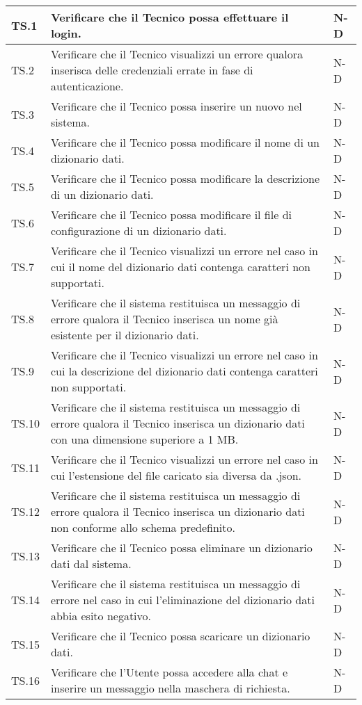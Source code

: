 \begin{adjustwidth}{-0.5cm}{-0.5cm}
\begin{longtable}{|P{1.5cm}|>{\raggedright}P{9.5cm}|>{\arraybackslash}P{1.5cm}|}
		TS.1 & Verificare che il Tecnico possa effettuare il login. & N-D \\
		\hline TS.2 & Verificare che il Tecnico visualizzi un errore qualora inserisca delle credenziali errate in fase di autenticazione. & N-D \\
		\hline TS.3 & Verificare che il Tecnico possa inserire un nuovo  nel sistema. & N-D \\ 
		\hline TS.4 & Verificare che il Tecnico possa modificare il nome di un dizionario dati. & N-D \\ 
		\hline TS.5 & Verificare che il Tecnico possa modificare la descrizione di un dizionario dati. & N-D \\
		\hline TS.6 & Verificare che il Tecnico possa modificare il file di configurazione di un dizionario dati. & N-D \\
		\hline TS.7 & Verificare che il Tecnico visualizzi un errore nel caso in cui il nome del dizionario dati contenga caratteri non supportati. & N-D \\ 
		\hline TS.8 & Verificare che il sistema restituisca un messaggio di errore qualora il Tecnico inserisca un nome già esistente per il dizionario dati. & N-D \\ 
		\hline TS.9 & Verificare che il Tecnico visualizzi un errore nel caso in cui la descrizione del dizionario dati contenga caratteri non supportati. & N-D \\ 
		\hline TS.10 & Verificare che il sistema restituisca un messaggio di errore qualora il Tecnico inserisca un dizionario dati con una dimensione superiore a 1 MB. & N-D \\
		\hline TS.11 & Verificare che il Tecnico visualizzi un errore nel caso in cui l'estensione del file caricato sia diversa da .json. & N-D \\ 
		\hline TS.12 & Verificare che il sistema restituisca un messaggio di errore qualora il Tecnico inserisca un dizionario dati non conforme allo schema predefinito. & N-D \\  
		\hline TS.13 & Verificare che il Tecnico possa eliminare un dizionario dati dal sistema. & N-D \\ 
		\hline TS.14 & Verificare che il sistema restituisca un messaggio di errore nel caso in cui l'eliminazione del dizionario dati abbia esito negativo. & N-D \\  
		\hline TS.15 & Verificare che il Tecnico possa scaricare un dizionario dati. & N-D \\
		\hline TS.16 & Verificare che l'Utente possa accedere alla chat e inserire un messaggio nella maschera di richiesta. & N-D \\   

\end{longtable}
\end{adjustwidth}
